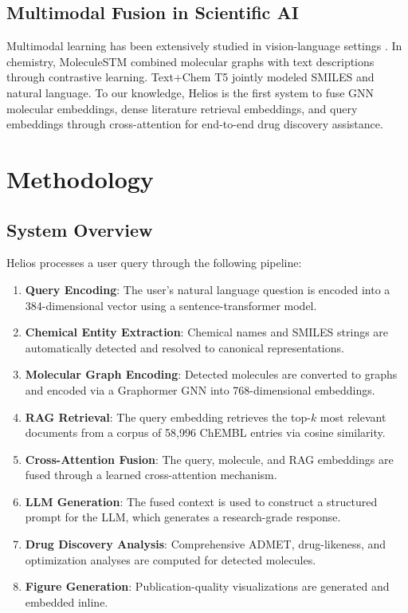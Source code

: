 \documentclass[conference]{IEEEtran}
\begin{document}
\subsection{Multimodal Fusion in Scientific AI}

Multimodal learning has been extensively studied in vision-language settings \cite{lu2019vilbert, li2020oscar}. In chemistry, MoleculeSTM \cite{liu2023moleculestm} combined molecular graphs with text descriptions through contrastive learning. Text+Chem T5 \cite{christofidellis2023text} jointly modeled SMILES and natural language. To our knowledge, Helios is the first system to fuse GNN molecular embeddings, dense literature retrieval embeddings, and query embeddings through cross-attention for end-to-end drug discovery assistance.

\section{Methodology}
\label{sec:methodology}

\subsection{System Overview}

Helios processes a user query through the following pipeline:

\begin{enumerate}
    \item \textbf{Query Encoding}: The user's natural language question is encoded into a 384-dimensional vector using a sentence-transformer model.
    \item \textbf{Chemical Entity Extraction}: Chemical names and SMILES strings are automatically detected and resolved to canonical representations.
    \item \textbf{Molecular Graph Encoding}: Detected molecules are converted to graphs and encoded via a Graphormer GNN into 768-dimensional embeddings.
    \item \textbf{RAG Retrieval}: The query embedding retrieves the top-$k$ most relevant documents from a corpus of 58,996 ChEMBL entries via cosine similarity.
    \item \textbf{Cross-Attention Fusion}: The query, molecule, and RAG embeddings are fused through a learned cross-attention mechanism.
    \item \textbf{LLM Generation}: The fused context is used to construct a structured prompt for the LLM, which generates a research-grade response.
    \item \textbf{Drug Discovery Analysis}: Comprehensive ADMET, drug-likeness, and optimization analyses are computed for detected molecules.
    \item \textbf{Figure Generation}: Publication-quality visualizations are generated and embedded inline.
\end{enumerate}
\end{document}
